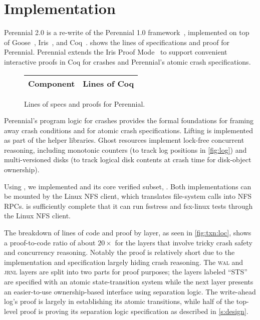 \section{Implementation}
\label{s:impl}

Perennial 2.0 is a re-write of the Perennial 1.0 framework~\cite{chajed:perennial}, implemented on top of
Goose~\cite{chajed:perennial, chajed:goose-coqpl},
Iris~\cite{jung:iris-jfp,jung:iris-1}, and Coq~\cite{coq}.  
shows the lines of specifications and proof for Perennial.  Perennial extends
the Iris Proof Mode~\cite{krebbers:ipm} to support convenient interactive
proofs in Coq for crashes and Perennial's atomic crash specifications.

\begin{figure}
\centering
\small
\begin{tabular}{lr}
\toprule
\bf Component & \bf Lines of Coq \\
\midrule
  
\end{tabular}
\caption{Lines of specs and proofs for Perennial.}
\label{fig:syslines}
\end{figure}

Perennial's program logic for crashes provides the formal foundations for
framing away crash conditions and for atomic crash specifications.
Lifting is implemented as part of the helper libraries.  Ghost resources
implement lock-free concurrent reasoning, including
monotonic counters (to track log positions in \cref{fig:log}) and
multi-versioned disks (to track logical disk contents at crash time
for disk-object ownership).

Using \txn, we implemented \gnfs and its core verified subset,
\simplenfs.  Both implementations can be mounted by the
Linux NFS client, which translates file-system calls into NFS RPCs.
\gnfs is sufficiently complete that it can run fsstress and fsx-linux
tests through the Linux NFS client.

The breakdown of lines of code and proof by layer, as seen in \cref{fig:txn:loc},
shows a proof-to-code ratio of about $20\times$ for the layers that involve
tricky crash safety and concurrency reasoning. Notably the \simplenfs proof is
relatively short due to the \txn implementation and specification largely hiding
crash reasoning. The \textsc{wal} and \textsc{jrnl} layers are split into two
parts for proof purposes; the layers labeled ``STS'' are specified with an
atomic state-transition system while the next layer presents an easier-to-use
ownership-based interface using separation logic. The write-ahead log's proof is
largely in establishing its atomic transitions, while half of the top-level \txn
proof is proving its separation logic specification as described in
\cref{s:design}.

